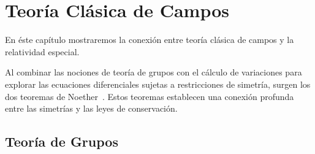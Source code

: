 \chapter{Teoría Clásica de Campos}
\label{chap:tcc} %
En éste capítulo mostraremos la conexión entre teoría clásica de campos y la relatividad
especial.  

Al combinar las nociones de teoría de grupos con el cálculo de variaciones para explorar 
las ecuaciones diferenciales sujetas a restricciones de simetría, surgen los dos teoremas de Noether~\cite{Quigg:2019bov}. 
Estos teoremas establecen una conexión profunda entre las simetrías y las leyes de conservación.



\section{Teoría de Grupos}

